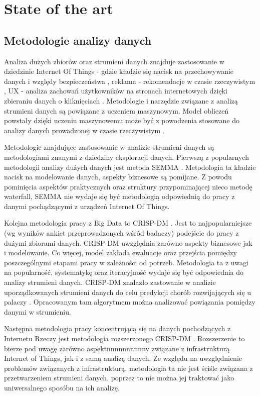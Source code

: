 \chapter{State of the art}

\section{Metodologie analizy danych}
Analiza dużych zbiorów oraz strumieni danych znajduje zastosowanie w dziedzinie Internet Of Things - gdzie kładzie się nacisk na przechowywanie danych i względy bezpieczeństwa \cite{Chui}, reklama - rekomendacje w czasie rzeczywistym \cite{Akter+Wamba}, UX - analiza zachowań użytkowników na stronach internetowych dzięki zbieraniu danych o kliknięciach \cite{Balachandran}. Metodologie i narzędzie związane z analizą strumieni danych są powiązane z uczeniem maszynowym. Model obliczeń powstały dzięki uczeniu maszynowemu może być z powodzenia stosowane do analizy danych prowadzonej w czasie rzeczywistym \cite{Brink+Richards+Fetherolf}.

Metodologie znajdujące zastosowanie w analizie strumieni danych są metodologiami znanymi z dziedziny eksploracji danych. Pierwszą z popularnych metodologii analizy dużych danych jest metoda SEMMA \cite{Semma}. Metodologia ta kładzie nacisk na modelowanie danych, aspekty biznesowe są pomijane. Z powodu pominięcia aspektów praktycznych oraz struktury przypominającej nieco metodę waterfall, SEMMA nie wydaje się być metodologią odpowiednią do pracy z danymi pochądzącymi z urządzeń Internet Of Things.

Kolejna metodologia pracy z Big Data to CRISP-DM \cite{Shearer}. Jest to najpopularniejsze (wg wyników ankiet przeprowadzonych wśród badaczy) podejście do pracy z dużymi zbiorami danych. CRISP-DM uwzględnia zarówno aspekty biznesowe jak i modelowanie. Co więcej, model zakłada ewaluacje oraz przejścia pomiędzy poszczególnymi etapami pracy w zależności od potrzeb. Metodologia ta z uwagi na popularność, systematykę oraz iteracyjność wydaje się być odpowiednia do analizy strumieni danych. CRISP-DM znalazło zastowanie w analizie uporządkowanych strumieni danych do celu predykcji chorób rozwijających się u palaczy \cite{Kalgotra+Sharda}. Opracowanym tam algorytmem można analizować powiązania pomiędzy danymi w strumieniu.

Następna metodologia pracy koncentrującą się na danych pochodzących z Internetu Rzeczy jest metodologia rozszerzonego CRISP-DM \cite{Bernard+Jaokar}. Rozszerzenie to bierze pod uwagę zarówno aspektnnnnnnnnnny związane z infrastrukturą Internet of Things, jak i z samą analizą danych. Ze względu na uwzględnienie problemów związanych z infrastrukturą, metodologia ta nie jest ściśle związana z przetwarzeniem strumieni danych, poprzez to nie można jej traktować jako uniwersalnego sposóbu na ich analizę.

